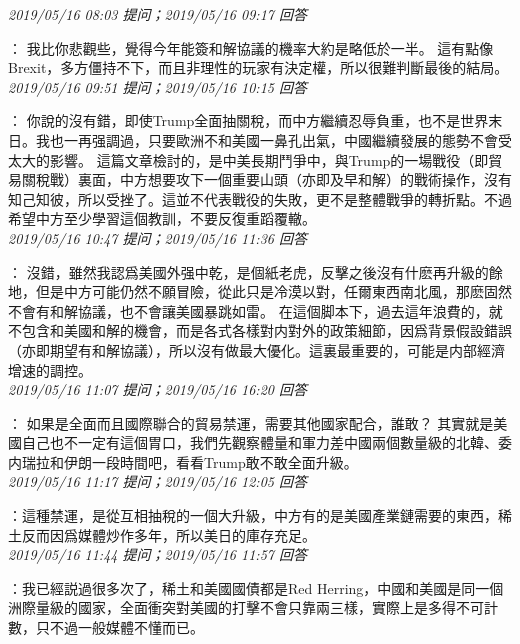 \documentclass[twocolumn]{ctexart}
\begin{document}
\textit{\hfill\noindent\small 2019/05/16 08:03 提问；2019/05/16 09:17 回答}

：
我比你悲觀些，覺得今年能簽和解協議的機率大約是略低於一半。
這有點像Brexit，多方僵持不下，而且非理性的玩家有決定權，所以很難判斷最後的結局。
\\

\textit{\hfill\noindent\small 2019/05/16 09:51 提问；2019/05/16 10:15 回答}

：
你說的沒有錯，即使Trump全面抽關稅，而中方繼續忍辱負重，也不是世界末日。我也一再强調過，只要歐洲不和美國一鼻孔出氣，中國繼續發展的態勢不會受太大的影響。 
這篇文章檢討的，是中美長期鬥爭中，與Trump的一場戰役（即貿易關稅戰）裏面，中方想要攻下一個重要山頭（亦即及早和解）的戰術操作，沒有知己知彼，所以受挫了。這並不代表戰役的失敗，更不是整體戰爭的轉折點。不過希望中方至少學習這個教訓，不要反復重蹈覆轍。
\\

\textit{\hfill\noindent\small 2019/05/16 10:47 提问；2019/05/16 11:36 回答}

：
沒錯，雖然我認爲美國外强中乾，是個紙老虎，反擊之後沒有什麽再升級的餘地，但是中方可能仍然不願冒險，從此只是冷漠以對，任爾東西南北風，那麽固然不會有和解協議，也不會讓美國暴跳如雷。
在這個脚本下，過去這年浪費的，就不包含和美國和解的機會，而是各式各樣對内對外的政策細節，因爲背景假設錯誤（亦即期望有和解協議），所以沒有做最大優化。這裏最重要的，可能是内部經濟增速的調控。
\\

\textit{\hfill\noindent\small 2019/05/16 11:07 提问；2019/05/16 16:20 回答}

：
如果是全面而且國際聯合的貿易禁運，需要其他國家配合，誰敢？
其實就是美國自己也不一定有這個胃口，我們先觀察體量和軍力差中國兩個數量級的北韓、委内瑞拉和伊朗一段時間吧，看看Trump敢不敢全面升級。
\\

\textit{\hfill\noindent\small 2019/05/16 11:17 提问；2019/05/16 12:05 回答}

：這種禁運，是從互相抽稅的一個大升級，中方有的是美國產業鏈需要的東西，稀土反而因爲媒體炒作多年，所以美日的庫存充足。
\\

\textit{\hfill\noindent\small 2019/05/16 11:44 提问；2019/05/16 11:57 回答}

：我已經説過很多次了，稀土和美國國債都是Red Herring，中國和美國是同一個洲際量級的國家，全面衝突對美國的打擊不會只靠兩三樣，實際上是多得不可計數，只不過一般媒體不懂而已。
\\
\end{document}
